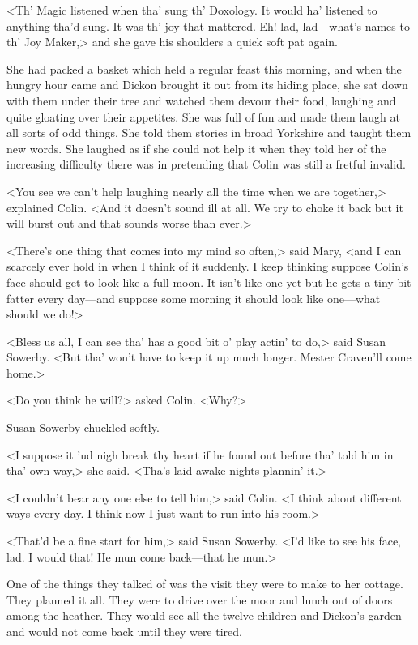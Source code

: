 <Th' Magic listened when tha' sung th' Doxology. It would ha' listened to anything tha'd sung. It was th' joy that mattered. Eh! lad, lad—what's names to th' Joy Maker,> and she gave his shoulders a quick soft pat again.

She had packed a basket which held a regular feast this morning, and when the hungry hour came and Dickon brought it out from its hiding place, she sat down with them under their tree and watched them devour their food, laughing and quite gloating over their appetites. She was full of fun and made them laugh at all sorts of odd things. She told them stories in broad Yorkshire and taught them new words. She laughed as if she could not help it when they told her of the increasing difficulty there was in pretending that Colin was still a fretful invalid.

<You see we can't help laughing nearly all the time when we are together,> explained Colin. <And it doesn't sound ill at all. We try to choke it back but it will burst out and that sounds worse than ever.>

<There's one thing that comes into my mind so often,> said Mary, <and I can scarcely ever hold in when I think of it suddenly. I keep thinking suppose Colin's face should get to look like a full moon. It isn't like one yet but he gets a tiny bit fatter every day—and suppose some morning it should look like one—what should we do!>

<Bless us all, I can see tha' has a good bit o' play actin' to do,> said Susan Sowerby. <But tha' won't have to keep it up much longer. Mester Craven'll come home.>

<Do you think he will?> asked Colin. <Why?>

Susan Sowerby chuckled softly.

<I suppose it 'ud nigh break thy heart if he found out before tha' told him in tha' own way,> she said. <Tha's laid awake nights plannin' it.>

<I couldn't bear any one else to tell him,> said Colin. <I think about different ways every day. I think now I just want to run into his room.>

<That'd be a fine start for him,> said Susan Sowerby. <I'd like to see his face, lad. I would that! He mun come back—that he mun.>

One of the things they talked of was the visit they were to make to her cottage. They planned it all. They were to drive over the moor and lunch out of doors among the heather. They would see all the twelve children and Dickon's garden and would not come back until they were tired.

